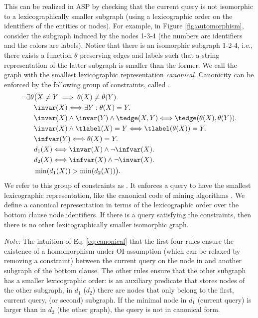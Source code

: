 This can be realized in ASP by checking that the current query is not isomorphic to a lexicographically smaller subgraph (using 
a lexicographic order on the identifiers of the entities or nodes). For example, in Figure \ref{fig:automorphism}, consider the subgraph induced by the nodes 1-3-4 (the numbers are identifiers and the colors are labels). Notice that there is an isomorphic subgraph 1-2-4, i.e., there exists a function $\theta$ preserving edges and labels such that a string representation of the latter subgraph is smaller than the former. We call the graph with the smallest lexicographic representation \textit{canonical}.
Canonicity can be enforced by the following group of constraints, called \NonIsomorphismConstraint.
\begin{equation}
  \begin{aligned}
    \neg \exists \theta & \big ( X \neq Y \implies \theta(X) \neq \theta(Y).\\ 
    & \invar(X) \Longleftrightarrow \exists Y: \theta(X) = Y.\\
    &  \invar(X) \wedge \invar(Y) \wedge \tedge(X,Y) \Longleftrightarrow \tedge(\theta(X), \theta(Y)).\\
    &  \invar(X) \wedge \tlabel(X) = Y \Longleftrightarrow \tlabel(\theta(X)) = Y.\\
    &  \infvar(Y) \Longleftrightarrow \theta(X) = Y. \\
    &  d_1(X) \Longleftrightarrow \invar(X) \wedge \lnot \infvar(X). \\ 
    &  d_2(X) \Longleftrightarrow \infvar(X) \wedge \lnot \invar(X). \\
    & \min(d_1(X)) > \min(d_2(X)) \big ).
  \end{aligned}
  \label{eq:canonical}
\end{equation}
We refer to this group of constraints as \NonIsomorphismConstraint. It enforces a query to have the smallest lexicographic representation, like the canonical code of mining algorithms \cite{farmer, condensed_luc}. We define a canonical representation in terms of the lexicographic order over the bottom clause node identifiers. If there is a query satisfying the constraints, then there is no other lexicographically smaller isomorphic graph. 

\noindent \emph{Note:}  The intuition of Eq. \ref{eq:canonical} that the first four rules ensure the existence of a homomorphism under OI-assumption (which can be relaxed by removing a constraint) between the current query on the node in \invar and another subgraph of the bottom clause. The other rules ensure that the other subgraph has a smaller lexicographic order: \infvar is an auxiliary predicate that stores nodes of the other subgraph, in $d_1$ ($d_2$) there are nodes that only belong to the first, current query, (or second) subgraph. If the minimal node in $d_1$ (current query) is larger than in $d_2$ (the other graph), the query is not in canonical form. 

